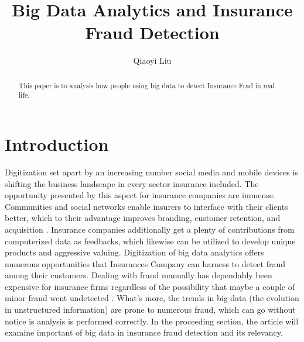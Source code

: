\documentclass[sigconf]{acmart}
\begin{document}
\author{Qiaoyi Liu}


\title{Big Data Analytics and Insurance Fraud Detection}

\renewcommand{\shortauthors}{Q. Liu}

\begin{abstract}
This paper is to analysis how people using big data to detect Insurance Frad in real life.
\end{abstract}


\maketitle

\section{Introduction}

 Digitization set apart by an increasing number social media and mobile devices is shifting the business landscape in every sector insurance included. The opportunity presented by this aspect for insurance companies are immense. Communities and social networks enable insurers to interface with their clients better, which to their advantage improves branding, customer retention, and acquisition \cite{1}. Insurance companies additionally get a plenty of contributions from computerized data as feedbacks, which likewise can be utilized to develop unique products and aggressive valuing. Digitization of big data analytics offers numerous opportunities that Insurances Company can harness to detect fraud among their customers. Dealing with fraud manually has dependably been expensive for insurance firms regardless of the possibility that maybe a couple of minor fraud went undetected \cite{2}. What's more, the trends in big data (the evolution in unstructured information) are prone to numerous fraud, which can go without notice is analysis is performed correctly. In the proceeding section, the article will examine important of big data in insurance fraud detection and its relevancy.  
\end{document}
